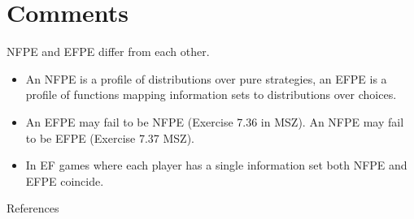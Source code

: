 \documentclass[10pt]{article}
\begin{document}
\section*{Comments}
NFPE and EFPE differ from each other.

\begin{itemize}
  \item An NFPE is a profile of distributions over pure strategies, an EFPE is a profile of functions mapping information sets to distributions over choices.
  \item An EFPE may fail to be NFPE (Exercise 7.36 in MSZ). An NFPE may fail to be EFPE (Exercise 7.37 MSZ).
  \item In EF games where each player has a single information set both NFPE and EFPE coincide.
\end{itemize}

References
\end{document}
